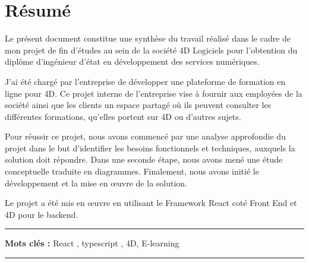 \chapter*{Résumé}


\hspace{10pt}Le présent document constitue une synthèse du travail réalisé dans le cadre de mon projet de fin d’études au sein de la société 4D Logiciels pour l’obtention du diplôme d’ingénieur d’état en développement des services numériques.

\vspace{10pt}

J'ai été chargé par l'entreprise de développer une plateforme de formation en ligne pour 4D. Ce projet interne de l'entreprise vise à fournir aux employées de la société ainsi que les clients un espace partagé où ils peuvent consulter les différentes formations, qu’elles portent sur 4D ou d’autres sujets.

\vspace{10pt}

Pour réussir ce projet, nous avons commencé par une analyse approfondie du projet dans le but d’identifier les besoins fonctionnels et techniques, auxquels la solution doit répondre. Dans une seconde étape, nous avons mené une étude conceptuelle traduite en diagrammes. Finalement, nous avons initié le développement et la mise en œuvre de la solution.

\vspace{10pt}

Le projet a été mis en œuvre en utilisant le Framework React coté Front End et 4D pour le backend.

\vspace{10pt}


\noindent\rule[2pt]{\textwidth}{0.5pt}

{\textbf{Mots clés :}}
React , typescript , 4D, E-learning 
\\
\noindent\rule[2pt]{\textwidth}{0.5pt}